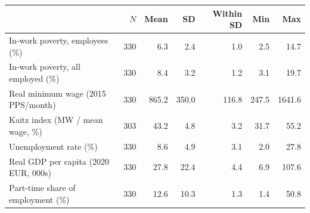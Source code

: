 \begin{tabular}{lrrrrrr}
\toprule
 & $N$ & Mean & SD & Within SD & Min & Max \\
\midrule
In-work poverty, employees (\%) & 330 & 6.3 & 2.4 & 1.0 & 2.5 & 14.7 \\
In-work poverty, all employed (\%) & 330 & 8.4 & 3.2 & 1.2 & 3.1 & 19.7 \\
Real minimum wage (2015 PPS/month) & 330 & 865.2 & 350.0 & 116.8 & 247.5 & 1641.6 \\
Kaitz index (MW / mean wage, \%) & 303 & 43.2 & 4.8 & 3.2 & 31.7 & 55.2 \\
Unemployment rate (\%) & 330 & 8.6 & 4.9 & 3.1 & 2.0 & 27.8 \\
Real GDP per capita (2020 EUR, 000s) & 330 & 27.8 & 22.4 & 4.4 & 6.9 & 107.6 \\
Part-time share of employment (\%) & 330 & 12.6 & 10.3 & 1.3 & 1.4 & 50.8 \\
\bottomrule
\end{tabular}
